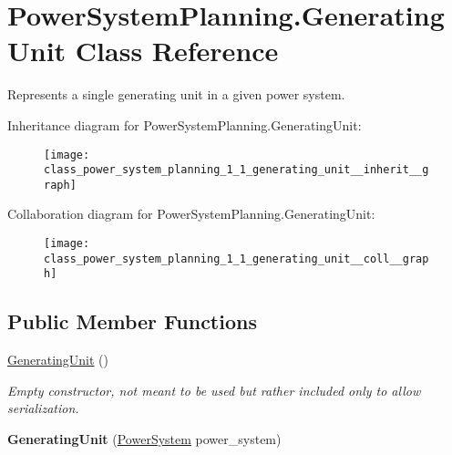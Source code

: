 \hypertarget{class_power_system_planning_1_1_generating_unit}{}\section{Power\+System\+Planning.\+Generating\+Unit Class Reference}
\label{class_power_system_planning_1_1_generating_unit}


Represents a single generating unit in a given power system.  




Inheritance diagram for Power\+System\+Planning.\+Generating\+Unit\+:\nopagebreak
\begin{figure}[H]
\begin{center}
\leavevmode
\texttt{[image: class\_power\_system\_planning\_1\_1\_generating\_unit\_\_inherit\_\_graph]}
\end{center}
\end{figure}


Collaboration diagram for Power\+System\+Planning.\+Generating\+Unit\+:\nopagebreak
\begin{figure}[H]
\begin{center}
\leavevmode
\texttt{[image: class\_power\_system\_planning\_1\_1\_generating\_unit\_\_coll\_\_graph]}
\end{center}
\end{figure}
\subsection*{Public Member Functions}
\begin{DoxyCompactItemize}
\item 
\hyperlink{class_power_system_planning_1_1_generating_unit_a854983fe68a7dc98636d454977d90ca2}{Generating\+Unit} ()
\begin{DoxyCompactList}\small\item\em Empty constructor, not meant to be used but rather included only to allow serialization. \end{DoxyCompactList}\item 
{\bfseries Generating\+Unit} (\hyperlink{class_power_system_planning_1_1_power_system}{Power\+System} power\+\_\+system)\hypertarget{class_power_system_planning_1_1_generating_unit_af69c171920f52f87b28431b4435bcfac}{}\label{class_power_system_planning_1_1_generating_unit_af69c171920f52f87b28431b4435bcfac}

\end{DoxyCompactItemize}
